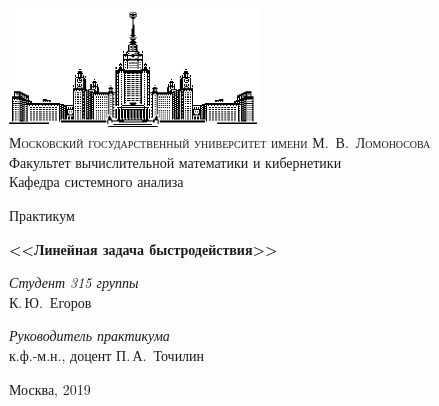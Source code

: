\thispagestyle{empty}
\begin{center}
    \ \vspace{-3cm}

    \includegraphics[width=0.5\textwidth]{title_page/msu.eps}\\

    {\scshape Московский государственный университет имени М.~В.~Ломоносова}\\
    Факультет вычислительной математики и кибернетики\\
    Кафедра системного анализа

    \vfill

    {\LARGE Практикум}

    \vspace{1cm}

    {\Huge\bfseries <<Линейная задача быстродействия>>}
\end{center}

\vspace{3cm}

\begin{flushright}
    \large
    \textit{Студент 315 группы}\\
    К.\,Ю.~Егоров

    \vspace{5mm}

    \textit{Руководитель практикума}\\
    к.ф.-м.н., доцент П.\,А.~Точилин
\end{flushright}

\vfill

\begin{center}
    Москва, 2019
\end{center}

\clearpage